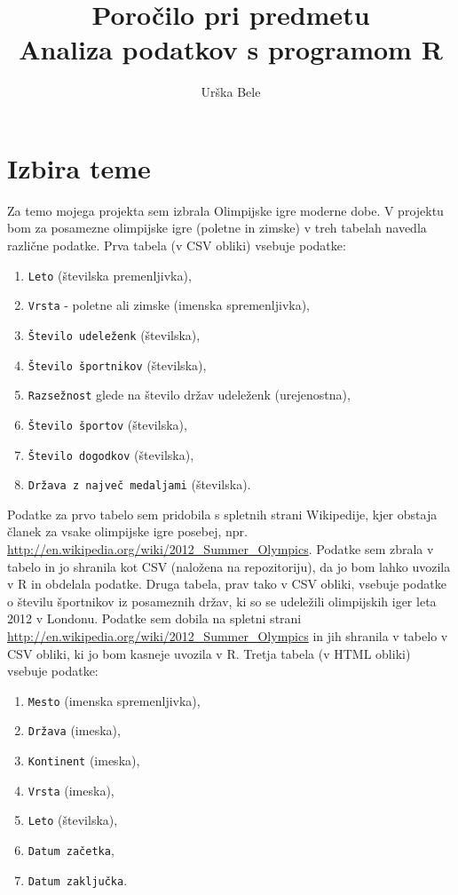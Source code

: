 \documentclass[11pt,a4paper]{article}
\begin{document}
\title{Poročilo pri predmetu \\
Analiza podatkov s programom R}
\author{Urška Bele}
\maketitle

\section{Izbira teme}

Za temo mojega projekta sem izbrala Olimpijske igre moderne dobe.
V projektu bom za posamezne olimpijske igre (poletne in zimske) v treh tabelah navedla različne podatke. \newline
Prva tabela (v CSV obliki) vsebuje podatke:
\begin{enumerate}
\item{\verb|Leto| (številska premenljivka),}
\item{\verb|Vrsta| - poletne ali zimske (imenska spremenljivka),}
\item{ \verb|Število udeleženk| (številska),}
\item{\verb|Število športnikov| (številska),}
\item{\verb|Razsežnost| glede na število držav udeleženk (urejenostna),}
\item{\verb|Število športov| (številska),}
\item{\verb|Število dogodkov| (številska),}
\item{\verb|Država z največ medaljami| (številska).}
\end{enumerate}
Podatke za prvo tabelo sem pridobila s spletnih strani
 Wikipedije, kjer obstaja članek za vsake olimpijske igre posebej, npr.
\url{http://en.wikipedia.org/wiki/2012_Summer_Olympics}. 
 Podatke sem zbrala v tabelo in jo shranila kot CSV (naložena na repozitoriju), da jo bom lahko uvozila v R 
 in obdelala podatke.
\newline
Druga tabela, prav tako v CSV obliki, vsebuje podatke o številu športnikov iz posameznih držav, ki so se udeležili 
olimpijskih iger leta 2012 v Londonu. Podatke sem dobila na spletni strani \url{http://en.wikipedia.org/wiki/2012_Summer_Olympics} in jih shranila v tabelo v CSV obliki, ki jo bom kasneje uvozila v R.
\newline
Tretja tabela (v HTML obliki) vsebuje podatke: 
\begin{enumerate}
\item{\verb|Mesto| (imenska spremenljivka),}
\item{\verb|Država| (imeska),}
\item{\verb|Kontinent| (imeska),}
\item{\verb|Vrsta| (imeska),}
\item{\verb|Leto| (številska),}
\item{\verb|Datum začetka|,}
\item{\verb|Datum zaključka|.}

\end{enumerate}
\end{document}
